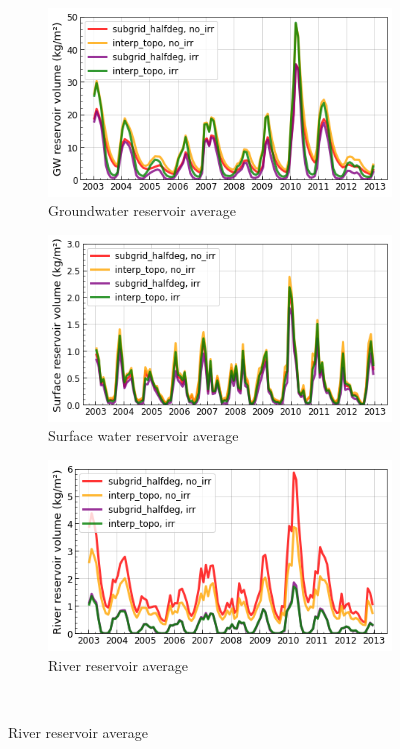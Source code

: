 \begin{figure}[htbp]
    \centering
    \begin{subfigure}[b]{0.32\textwidth}
        \caption{Groundwater reservoir average}
        \includegraphics[width=\linewidth]{images/chap3/time_series/slowr_time_series.png}
    \end{subfigure}
    \begin{subfigure}[b]{0.32\textwidth}
        \caption{Surface water reservoir average}
        \includegraphics[width=\linewidth]{images/chap3/time_series/fastr_time_series.png}
    \end{subfigure}
    \begin{subfigure}[b]{0.32\textwidth}
        \caption{River reservoir average}
        \includegraphics[width=\linewidth]{images/chap3/time_series/streamr_time_series.png}
    \end{subfigure} \\


\end{figure}
